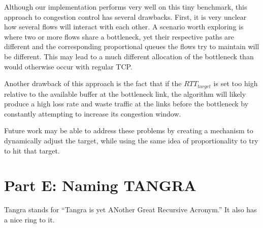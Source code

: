 \documentclass[12pt]{article}
\begin{document}
Although our implementation performs very well on this tiny benchmark, this
approach to congestion control has several drawbacks. First, it is very unclear
how several flows will interact with each other. A scenario worth exploring is
where two or more flows share a bottleneck, yet their respective paths are
different and the corresponding proportional queues the flows try to maintain
will be different. This may lead to a much different allocation of the
bottleneck than would otherwise occur with regular TCP.

Another drawback of this approach is the fact that if the $RTT_{target}$ is set
too high relative to the available buffer at the bottleneck link, the algorithm
will likely produce a high loss rate and waste traffic at the links before the
bottleneck by constantly attempting to increase its congestion window.

Future work may be able to address these problems by creating a mechanism to
dynamically adjust the target, while using the same idea of proportionality to
try to hit that target.

\section*{Part E: Naming TANGRA}

Tangra stands for ``Tangra is yet ANother Great Recursive Acronym.'' It also has
a nice ring to it.
\end{document}
